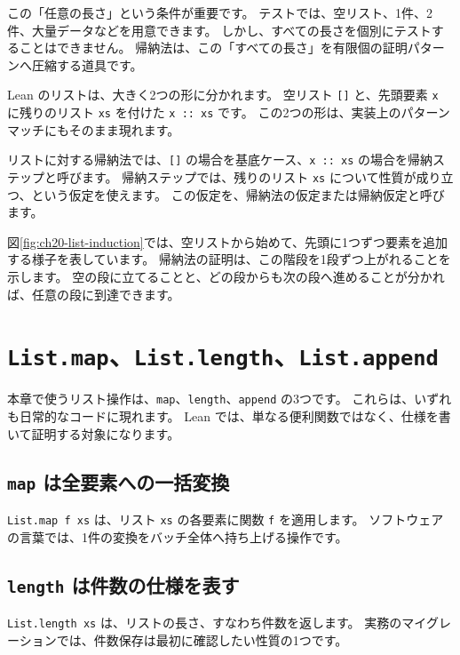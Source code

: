 この「任意の長さ」という条件が重要です。
テストでは、空リスト、1件、2件、大量データなどを用意できます。
しかし、すべての長さを個別にテストすることはできません。
帰納法は、この「すべての長さ」を有限個の証明パターンへ圧縮する道具です。

Lean のリストは、大きく2つの形に分かれます。
空リスト \texttt{[]} と、先頭要素 \texttt{x} に残りのリスト \texttt{xs} を付けた \texttt{x :: xs} です。
この2つの形は、実装上のパターンマッチにもそのまま現れます。

リストに対する帰納法では、\texttt{[]} の場合を基底ケース、\texttt{x :: xs} の場合を帰納ステップと呼びます。
帰納ステップでは、残りのリスト \texttt{xs} について性質が成り立つ、という仮定を使えます。
この仮定を、帰納法の仮定または帰納仮定と呼びます。


図\ref{fig:ch20-list-induction}では、空リストから始めて、先頭に1つずつ要素を追加する様子を表しています。
帰納法の証明は、この階段を1段ずつ上がれることを示します。
空の段に立てることと、どの段からも次の段へ進めることが分かれば、任意の段に到達できます。

\section{\texttt{List.map}、\texttt{List.length}、\texttt{List.append}}

本章で使うリスト操作は、\texttt{map}、\texttt{length}、\texttt{append} の3つです。
これらは、いずれも日常的なコードに現れます。
Lean では、単なる便利関数ではなく、仕様を書いて証明する対象になります。

\subsection{\texttt{map} は全要素への一括変換}

\texttt{List.map f xs} は、リスト \texttt{xs} の各要素に関数 \texttt{f} を適用します。
ソフトウェアの言葉では、1件の変換をバッチ全体へ持ち上げる操作です。

\subsection{\texttt{length} は件数の仕様を表す}

\texttt{List.length xs} は、リストの長さ、すなわち件数を返します。
実務のマイグレーションでは、件数保存は最初に確認したい性質の1つです。


